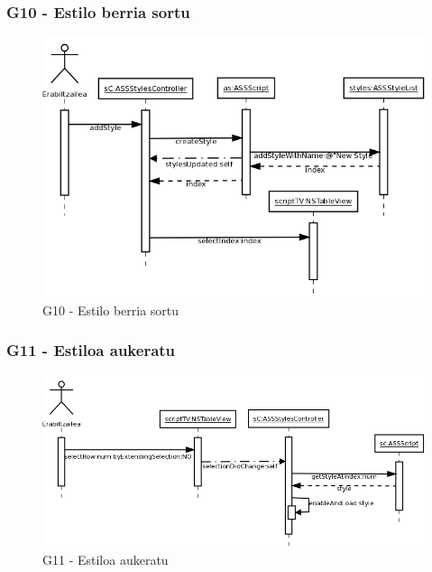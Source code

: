 \subsubsection{G10 - Estilo berria sortu}
\begin{figure}[htp]
\begin{center}
\includegraphics[scale=0.35]{Pictures/Chapter4/Diseinua/G10.png}
\caption{G10 - Estilo berria sortu}
\label{g10d}
\end{center}
\end{figure}

\newpage
\subsubsection{G11 - Estiloa aukeratu}
\begin{figure}[htp]
\begin{center}
\includegraphics[scale=0.35]{Pictures/Chapter4/Diseinua/G11.png}
\caption{G11 - Estiloa aukeratu}
\label{g11d}
\end{center}
\end{figure}

